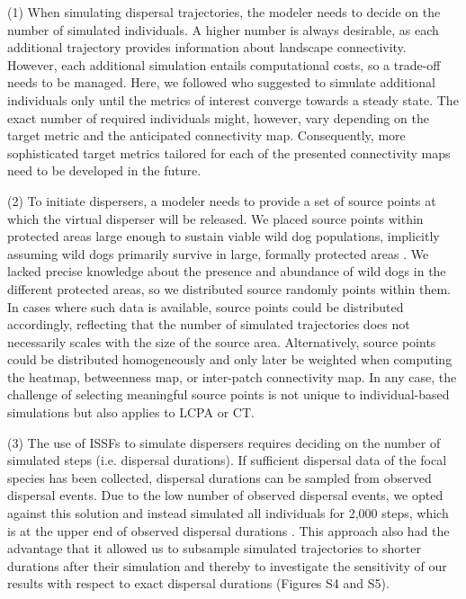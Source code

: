 \documentclass[abstract=on,10pt,a4paper,bibliography=totocnumbered]{article}
\begin{document}
(1) When simulating dispersal trajectories, the modeler needs to decide on the
number of simulated individuals. A higher number is always desirable, as each
additional trajectory provides information about landscape connectivity.
However, each additional simulation entails computational costs, so a trade-off
needs to be managed. Here, we followed \cite{Signer.2017} who suggested to
simulate additional individuals only until the metrics of interest converge
towards a steady state. The exact number of required individuals might, however,
vary depending on the target metric and the anticipated connectivity map.
Consequently, more sophisticated target metrics tailored for each of the
presented connectivity maps need to be developed in the future.

(2) To initiate dispersers, a modeler needs to provide a set of source points at
which the virtual disperser will be released. We placed source points within
protected areas large enough to sustain viable wild dog populations, implicitly
assuming wild dogs primarily survive in large, formally protected areas
\citep{Woodroffe.1999, DaviesMostert.2012, Woodroffe.2012, VanDerMeer.2014}. We
lacked precise knowledge about the presence and abundance of wild dogs in the
different protected areas, so we distributed source randomly points within them.
In cases where such data is available, source points could be distributed
accordingly, reflecting that the number of simulated trajectories does not
necessarily scales with the size of the source area. Alternatively, source
points could be distributed homogeneously and only later be weighted when
computing the heatmap, betweenness map, or inter-patch connectivity map. In any
case, the challenge of selecting meaningful source points is not unique to
individual-based simulations but also applies to LCPA or CT.

(3) The use of ISSFs to simulate dispersers requires deciding on the number of
simulated steps (i.e. dispersal durations). If sufficient dispersal data of the
focal species has been collected, dispersal durations can be sampled from
observed dispersal events. Due to the low number of observed dispersal events,
we opted against this solution and instead simulated all individuals for 2,000
steps, which is at the upper end of observed dispersal durations
\citep{DaviesMostert.2012, Masenga.2016, Cozzi.2020, Hofmann.2021}. This
approach also had the advantage that it allowed us to subsample simulated
trajectories to shorter durations after their simulation and thereby to
investigate the sensitivity of our results with respect to exact dispersal
durations (Figures S4 and S5).
\end{document}
